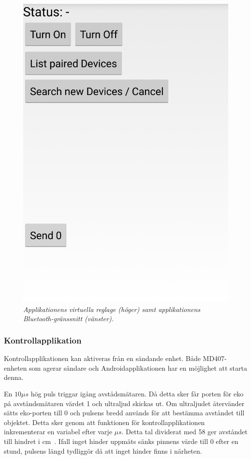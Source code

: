 \documentclass[a4paper]{article}
\begin{document}
\begin{figure}[H]
\includegraphics[scale=0.2]{applikation2.png}
\centering
\caption{\it Applikationens virtuella reglage (höger) samt applikationens Bluetooth-gränssnitt (vänster).}
\end{figure} 

\subsubsection{Kontrollapplikation}
Kontrollapplikationen kan aktiveras från en sändande enhet. Både MD407-enheten som agerar sändare och Androidapplikationen har en möjlighet att starta denna. %


\vspace{5mm} \noindent
En $10\mu s$ hög puls triggar igång avstådsmätaren. Då detta sker får porten för eko på avståndsmätaren värdet 1 och ultraljud skickas ut. Om ultraljudet återvänder sätts eko-porten till 0 och pulsens bredd används för att bestämma avståndet till objektet. Detta sker genom att funktionen för kontrollapplikationen inkrementerar en variabel efter varje $\mu s$. Detta tal dividerat med 58 ger avståndet till hindret i cm~\cite{DistMeasure}. Ifall inget hinder uppmäts sänks pinnens värde till 0 efter en stund, pulsens längd tydliggör då att inget hinder finns i närheten.
\end{document}
